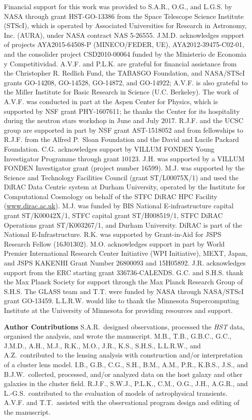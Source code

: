 \documentclass{article}
\def\HST{{\it HST}\xspace}
\begin{document}
Financial support for this work was provided to S.A.R., O.G., and
L.G.S. by NASA through grant HST-GO-13386 from the Space Telescope
Science Institute (STScI), which is operated by Associated
Universities for Research in Astronomy, Inc. (AURA), under NASA
contract NAS 5-26555.  J.M.D. acknowledges support of projects
AYA2015-64508-P (MINECO/FEDER, UE), AYA2012-39475-C02-01, and the
consolider project CSD2010-00064 funded by the Ministerio de Economia
y Competitividad.  A.V.F. and P.L.K. are grateful for financial
assistance from the Christopher R. Redlich Fund, the TABASGO
Foundation, and NASA/STScI grants GO-14208, GO-14528, GO-14872, 
and GO-14922; A.V.F. is also grateful to the Miller Institute for
Basic Research in Science (U.C. Berkeley).  The work
of A.V.F. was conducted in part at the Aspen Center for Physics, which
is supported by NSF grant PHY-1607611; he thanks the Center for its
hospitality during the neutron stars workshop in June and July 2017.
R.J.F. and the UCSC group are supported in part by NSF grant
AST-1518052 and from fellowships to R.J.F. from the Alfred P.\ Sloan 
Foundation and the David and Lucile Packard Foundation.
C.G. acknowledges support by VILLUM FONDEN Young Investigator
Programme through grant 10123. J.H. was supported by a VILLUM
FONDEN Investigator grant (project number 16599).  M.J. was supported
by the Science and Technology Facilities Council (grant
ST/L00075X/1) and used the DiRAC Data Centric system at Durham
University, operated by the Institute for Computational Cosmology on
behalf of the STFC DiRAC HPC Facility (\url{www.dirac.ac.uk}).
M.J. was funded by BIS National E-infrastructure capital grant
ST/K00042X/1, STFC capital grant ST/H008519/1, STFC DiRAC
Operations grant ST/K003267/1, and Durham University. DiRAC is part of
the National E-Infrastructure.  R.K. was supported by Grant-in-Aid for
JSPS Research Fellow (16J01302).  M.O.  acknowledges support in part
by World Premier International Research Center Initiative (WPI
Initiative), MEXT, Japan, and JSPS KAKENHI Grant Number 26800093 and
15H05892.  J.R. acknowledges support from the ERC starting grant
336736-CALENDS.  G.C. and S.H.S. thank the Max Planck Society for
support through the Max Planck Research Group of S.H.S.  The
GLASS team and T.T. were funded by NASA through NASA/STScI grant 
GO-13459.  L.L.R.W. would like to thank the Minnesota Supercomputing
Institute at the University of Minnesota for providing resources and
support.

\medskip
{\bf Author Contributions} 
S.A.R.~designed observations, processed the \HST data, organised the
analysis, and wrote the manuscript.  M.B., T.B., G.B.C., G.C.,
J.M.D., A.H., M.J., R.K., M.O., J.R., K.S., S.H.S.,
L.L.R.W., and A.Z.~contributed to the lensing analysis with
construction and/or interpretation of a cluster lens model.  I.B.,
G.B., C.G., S.H., B.M., A.M., P.R., K.B.S., J.S., and
B.J.W.~collected, processed, and/or analyzed data on the host galaxy
and other galaxies in the cluster field.  R.J.F., S.W.J.,
P.L.K., C.M., O.G., J.H., A.G.R., and L.-G.S.~contributed to
the evaluation of models of astrophysical transients. A.V.F. and
T.T.~assisted with the observational program design and editing of
the manuscript.
\end{document}
